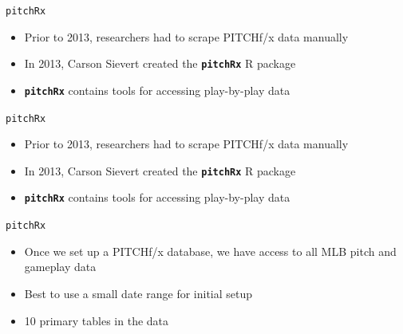 \begin{frame}[fragile]{\texttt{pitchRx}}

\begin{itemize}
\tightlist
\item
  Prior to 2013, researchers had to scrape PITCHf/x data manually
\item
  In 2013, Carson Sievert created the \textbf{\texttt{pitchRx}} R
  package
\item
  \textbf{\texttt{pitchRx}} contains tools for accessing play-by-play
  data
\end{itemize}

\end{frame}

\begin{frame}[fragile]{\texttt{pitchRx}}

\begin{itemize}
\tightlist
\item
  Prior to 2013, researchers had to scrape PITCHf/x data manually
\item
  In 2013, Carson Sievert created the \textbf{\texttt{pitchRx}} R
  package
\item
  \textbf{\texttt{pitchRx}} contains tools for accessing play-by-play
  data
\end{itemize}

\footnotesize

\begin{Shaded}
\begin{Highlighting}[]
\StringTok{ }\NormalTok{(}\NormalTok{, } \NormalTok{)}
\StringTok{ }\NormalTok{(}\NormalTok{, }\NormalTok{, }\NormalTok{)}
\NormalTok{(} \NormalTok{, } \NormalTok{, } 
   
\StringTok{ }\NormalTok{(}\NormalTok{)}
\end{Highlighting}
\end{Shaded}

\end{frame}

\begin{frame}{\texttt{pitchRx}}

\begin{itemize}
\tightlist
\item
  Once we set up a PITCHf/x database, we have access to all MLB pitch
  and gameplay data
\item
  Best to use a small date range for initial setup
\item
  10 primary tables in the data
\end{itemize}

\end{frame}

